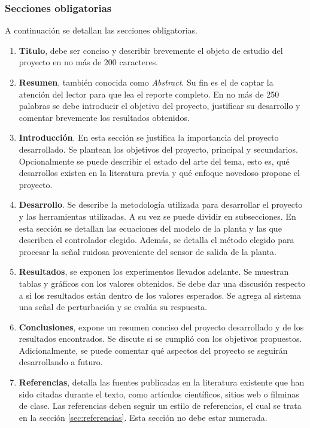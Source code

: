 \documentclass{article}
\begin{document}
\subsubsection{Secciones obligatorias}

A continuación se detallan las secciones obligatorias.

\begin{enumerate}

    \item \textbf{Titulo}, debe ser conciso y describir brevemente el objeto de estudio del proyecto en no más de 200 caracteres.
    
    \item \textbf{Resumen}, también conocida como \textit{Abstract}. Su fin es el de captar la atención del lector para que lea el reporte completo. En no más de 250 palabras se debe introducir el objetivo del proyecto, justificar su desarrollo y comentar brevemente los resultados obtenidos.
    
    \item \textbf{Introducción}. En esta sección se justifica la importancia del proyecto desarrollado. Se plantean los objetivos del proyecto, principal y secundarios. Opcionalmente se puede describir el estado del arte del tema, esto es, qué desarrollos existen en la literatura previa y qué enfoque novedoso propone el proyecto.
    
    \item \textbf{Desarrollo}. Se describe la metodología utilizada para desarrollar el proyecto y las herramientas utilizadas. A su vez se puede dividir en subsecciones. En esta sección se detallan las ecuaciones del modelo de la planta y las que describen el controlador elegido. Además, se detalla el método elegido para procesar la señal ruidosa proveniente del sensor de salida de la planta.

    \item \textbf{Resultados}, se exponen los experimentos llevados adelante. Se muestran tablas y gráficos con los valores obtenidos. Se debe dar una discusión respecto a si los resultados están dentro de los valores esperados. Se agrega al sistema una señal de perturbación y se evalúa su respuesta.
    
    \item \textbf{Conclusiones}, expone un resumen conciso del proyecto desarrollado y de los resultados encontrados. Se discute si se cumplió con los objetivos propuestos. Adicionalmente, se puede comentar qué aspectos del proyecto se seguirán desarrollando a futuro.

    \item \textbf{Referencias}, detalla las fuentes publicadas en la literatura existente que han sido citadas durante el texto, como artículos científicos, sitios web o filminas de clase. Las referencias deben seguir un estilo de referencias, el cual se trata en la sección \ref{sec:referencias}. Esta sección no debe estar numerada.
    
\end{enumerate}
\end{document}
